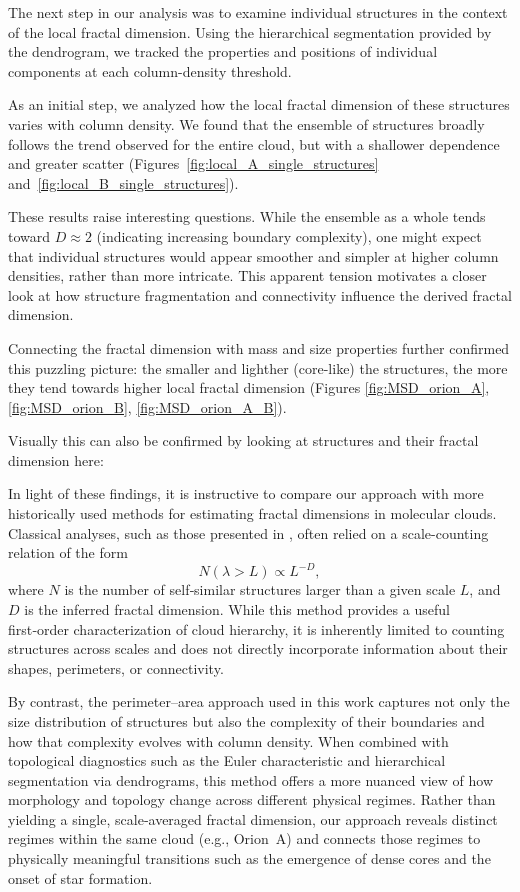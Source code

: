 The next step in our analysis was to examine individual structures in the context of the local fractal dimension.  
Using the hierarchical segmentation provided by the dendrogram, we tracked the properties and positions of individual components at each column-density threshold.

As an initial step, we analyzed how the local fractal dimension of these structures varies with column density.  
We found that the ensemble of structures broadly follows the trend observed for the entire cloud, but with a shallower dependence and greater scatter (Figures~\ref{fig:local_A_single_structures} and~\ref{fig:local_B_single_structures}).  

These results raise interesting questions.  
While the ensemble as a whole tends toward \(D \approx 2\) (indicating increasing boundary complexity), one might expect that individual structures would appear smoother and simpler at higher column densities, rather than more intricate.  
This apparent tension motivates a closer look at how structure fragmentation and connectivity influence the derived fractal dimension.

Connecting the fractal dimension with mass and size properties further confirmed this puzzling picture: the smaller and lighther (core-like) the structures, the more they tend towards higher local fractal dimension (Figures \ref{fig:MSD_orion_A}, \ref{fig:MSD_orion_B}, \ref{fig:MSD_orion_A_B}).

Visually this can also be confirmed by looking at structures and their fractal dimension here:

In light of these findings, it is instructive to compare our approach with more historically used methods for estimating fractal dimensions in molecular clouds.  
Classical analyses, such as those presented in \cite{elmegreen1996fractal}, often relied on a scale-counting relation of the form
\[
N(\lambda > L) \propto L^{-D},
\]
where \(N\) is the number of self‑similar structures larger than a given scale \(L\), and \(D\) is the inferred fractal dimension.  
While this method provides a useful first‑order characterization of cloud hierarchy, it is inherently limited to counting structures across scales and does not directly incorporate information about their shapes, perimeters, or connectivity.

By contrast, the perimeter–area approach used in this work captures not only the size distribution of structures but also the complexity of their boundaries and how that complexity evolves with column density.  
When combined with topological diagnostics such as the Euler characteristic and hierarchical segmentation via dendrograms, this method offers a more nuanced view of how morphology and topology change across different physical regimes.  
Rather than yielding a single, scale‑averaged fractal dimension, our approach reveals distinct regimes within the same cloud (e.g., Orion~A) and connects those regimes to physically meaningful transitions such as the emergence of dense cores and the onset of star formation.

